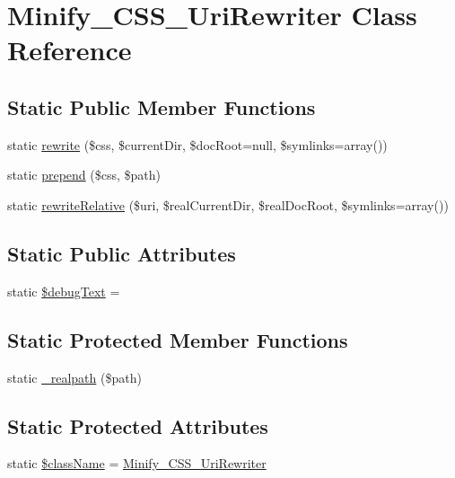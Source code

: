 \hypertarget{class_minify___c_s_s___uri_rewriter}{}\section{Minify\+\_\+\+C\+S\+S\+\_\+\+Uri\+Rewriter Class Reference}
\label{class_minify___c_s_s___uri_rewriter}
\subsection*{Static Public Member Functions}
\begin{DoxyCompactItemize}
\item 
static \hyperlink{class_minify___c_s_s___uri_rewriter_a96f66fbccdd00032722f1e6338f3bd19}{rewrite} (\$css, \$current\+Dir, \$doc\+Root=null, \$symlinks=array())
\item 
static \hyperlink{class_minify___c_s_s___uri_rewriter_aebcfd302657ddfacee88ab3964683806}{prepend} (\$css, \$path)
\item 
static \hyperlink{class_minify___c_s_s___uri_rewriter_a96784884f70389c5a0419017576ff6e0}{rewrite\+Relative} (\$uri, \$real\+Current\+Dir, \$real\+Doc\+Root, \$symlinks=array())
\end{DoxyCompactItemize}
\subsection*{Static Public Attributes}
\begin{DoxyCompactItemize}
\item 
static \hyperlink{class_minify___c_s_s___uri_rewriter_ae1e033836f8516eac6ef8cb3aafe5e96}{\$debug\+Text} = \textquotesingle{}\textquotesingle{}
\end{DoxyCompactItemize}
\subsection*{Static Protected Member Functions}
\begin{DoxyCompactItemize}
\item 
static \hyperlink{class_minify___c_s_s___uri_rewriter_affe1d7c81f17e01b9bc735bae70aa0ef}{\+\_\+realpath} (\$path)
\end{DoxyCompactItemize}
\subsection*{Static Protected Attributes}
\begin{DoxyCompactItemize}
\item 
static \hyperlink{class_minify___c_s_s___uri_rewriter_acd6a475a6eeb092f4eea3e19e502d67d}{\$class\+Name} = \textquotesingle{}\hyperlink{class_minify___c_s_s___uri_rewriter}{Minify\+\_\+\+C\+S\+S\+\_\+\+Uri\+Rewriter}\textquotesingle{}
\end{DoxyCompactItemize}


